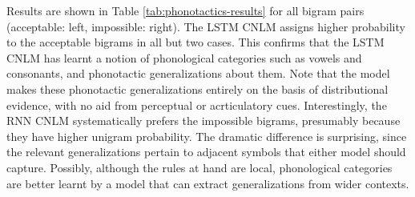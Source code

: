 Results are shown in Table \ref{tab:phonotactics-results} for all
bigram pairs (acceptable: left, impossible: right).  The LSTM CNLM
assigns higher probability to the acceptable bigrams in all but two
cases.  This confirms that the LSTM CNLM has learnt a notion of
phonological categories such as vowels and consonants, and phonotactic
generalizations about them.  Note that the model makes these
phonotactic generalizations entirely on the basis of distributional
evidence, with no aid from perceptual or acrticulatory
cues. Interestingly, the RNN CNLM systematically prefers the
impossible bigrams, presumably because they have higher unigram
probability. The dramatic difference is surprising, since the relevant
generalizations pertain to adjacent symbols that either model should
capture. Possibly, although the rules at hand are local, phonological
categories are better learnt by a model that can extract
generalizations from wider contexts.

